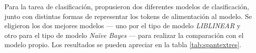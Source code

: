Para la tarea de clasificación, \citeauthor{villegas:2014:CACIC} propusieron dos diferentes modelos de clasificación, junto con distintas formas de representar los tokens de alimentación al modelo. Se eligieron los dos mejores modelos --- uno por el tipo de modelo \textit{LIBLINEAR} y otro para el tipo de modelo \textit{Naïve Bayes} --- para realizar la comparación con el modelo propio. Los resultados se pueden apreciar en la tabla \ref{tab:spantextres}.





